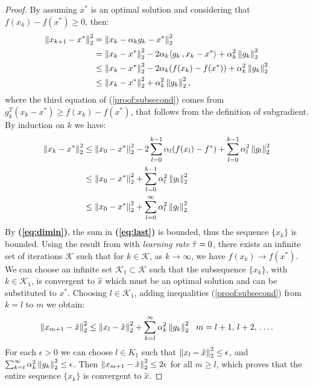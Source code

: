 \begin{proof}
By assuming $x^*$ is an optimal solution and considering that $f(x_k) - f(x^*) \geq 0$, then:
\begin{align}
    \begin{split}
        \left\lVert x_{k+1} - x^* \right\rVert_2^2 & = \left\lVert x_k - \alpha_kg_k - x^* \right\rVert_2^2\\
        & = \left\lVert x_k - x^* \right\rVert_2^2 - 2\alpha_k\langle g_k\,,x_k - x^*\rangle + \alpha_k^2\left\lVert g_k \right\rVert_2^2 \\
        & \leq \left\lVert x_k - x^* \right\rVert_2^2 - 2\alpha_k(f(x_k) - f(x^*)) + \alpha_k^2\left\lVert g_k \right\rVert_2^2\\
        & \leq \left\lVert x_k - x^* \right\rVert_2^2 + \alpha_k^2\left\lVert g_k \right\rVert_2^2,
        \label{proof:subsecond}
    \end{split}
\end{align}
where the third equation of (\ref{proof:subsecond}) comes from $g_k^T(x_k - x^*) \geq f(x_k) - f(x^*)$, that follows from the definition of subgradient.
By induction on $k$ we have:
\begin{align}
    \label{eq:bound}
    \left\lVert x_k - x^* \right\rVert_2^2 &\leq \left\lVert x_0 - x^* \right\rVert_2^2 - 2\sum_{l=0}^{k-1}\alpha_l(f(x_l)-f^*) + \sum_{l=0}^{k-1}\alpha_l^2\left\lVert g_l \right\rVert_2^2\\
    & \leq \left\lVert x_0 - x^* \right\rVert_2^2 + \sum_{l=0}^{k-1}\alpha_l^2\left\lVert g_l \right\rVert_2^2\\
    & \leq \left\lVert x_0 - x^* \right\rVert_2^2 + \sum_{l=0}^\infty\alpha_l^2\left\lVert g_l \right\rVert_2^2
    \label{eq:last}
\end{align}
By \textbf{(\ref{eq:dimin})}, the sum in \textbf{(\ref{eq:last})} is bounded, thus the sequence $\{x_k\}$ is bounded. Using the result from \parencite[Theorem 7.2]{nonlinearrus} with \textit{learning rate} $\Bar{\tau}=0$, there exists an infinite set of iterations $\mathcal{K}$ such that for $k\in\mathcal{K}$, as $k\to\infty$, we have $f(x_k)\to f(x^*)$. We can choose an infinite set $\mathcal{K}_1\subset\mathcal{K}$ such that the subsequence $\{x_k\}$, with $k\in\mathcal{K}_1$, is convergent to $\hat{x}$ which must be an optimal solution and can be substituted to $x^*$. Choosing $l\in\mathcal{K}_1$, adding inequalities (\ref{proof:subsecond}) from $k=l$ to $m$ we obtain:
\begin{align*}
    \left\lVert x_{m+1}-\hat{x} \right\rVert_2^2 \leq \left\lVert x_l - \hat{x} \right\rVert_2^2 + \sum_{k=l}^\infty\alpha_k^2\left\lVert g_k \right\rVert_2^2\, \, \, \, m=l+1,\, l+2,\, \dots.
\end{align*}
For each $\epsilon>0$ we can choose $l\in\mathit{K_1}$ such that $\left\lVert x_l - \hat{x} \right\rVert_2^2 \leq \epsilon$, and $\sum_{k=l}^\infty\alpha_k^2\left\lVert g_k \right\rVert_2^2\leq\epsilon$. Then $\left\lVert x_{m+1} - \hat{x} \right\rVert_2^2\leq 2\epsilon$ for all $m\geq l$, which proves that the entire sequence $\{x_k\}$ is convergent to $\hat{x}$.
\end{proof}


